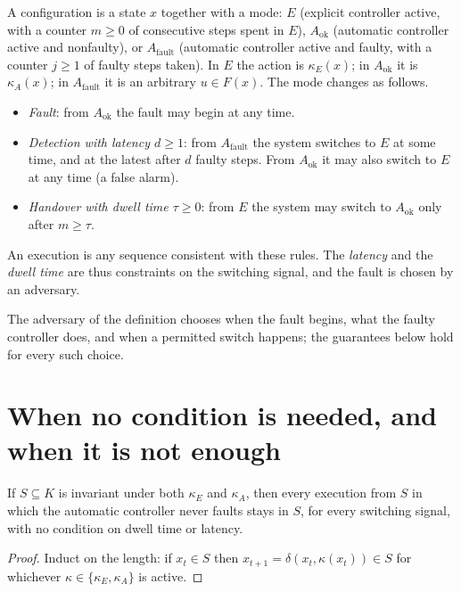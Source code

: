 \begin{definition}\label{def:hybrid}
A configuration is a state $x$ together with a mode: $E$ (explicit controller active, with a counter $m\ge0$ of consecutive steps spent in $E$), $A_{\mathrm{ok}}$ (automatic controller active and nonfaulty), or $A_{\mathrm{fault}}$ (automatic controller active and faulty, with a counter $j\ge1$ of faulty steps taken). In $E$ the action is $\kappa_E(x)$; in $A_{\mathrm{ok}}$ it is $\kappa_A(x)$; in $A_{\mathrm{fault}}$ it is an arbitrary $u\in F(x)$. The mode changes as follows.
\begin{itemize}[nosep]
  \item \emph{Fault}: from $A_{\mathrm{ok}}$ the fault may begin at any time.
  \item \emph{Detection with latency $d\ge1$}: from $A_{\mathrm{fault}}$ the system switches to $E$ at some time, and at the latest after $d$ faulty steps. From $A_{\mathrm{ok}}$ it may also switch to $E$ at any time (a false alarm).
  \item \emph{Handover with dwell time $\tau\ge0$}: from $E$ the system may switch to $A_{\mathrm{ok}}$ only after $m\ge\tau$.
\end{itemize}
An execution is any sequence consistent with these rules. The \emph{latency} and the \emph{dwell time} are thus constraints on the switching signal, and the fault is chosen by an adversary.
\end{definition}

The adversary of the definition chooses when the fault begins, what the faulty controller does, and when a permitted switch happens; the guarantees below hold for every such choice.

\section{When no condition is needed, and when it is not enough}

\begin{newresult}\label{prop:common}
If $S\subseteq K$ is invariant under both $\kappa_E$ and $\kappa_A$, then every execution from $S$ in which the automatic controller never faults stays in $S$, for every switching signal, with no condition on dwell time or latency.
\end{newresult}
\begin{proof}
Induct on the length: if $x_t\in S$ then $x_{t+1}=\delta(x_t,\kappa(x_t))\in S$ for whichever $\kappa\in\{\kappa_E,\kappa_A\}$ is active.
\end{proof}

